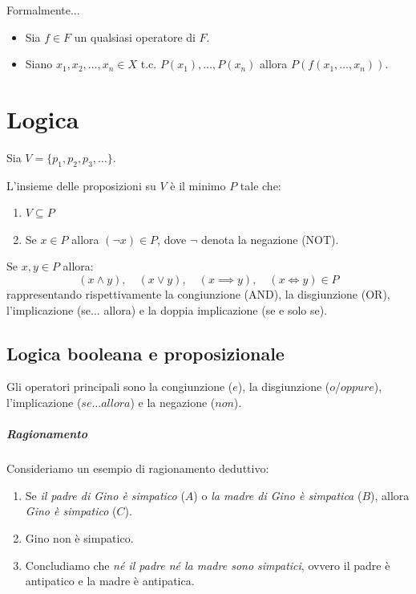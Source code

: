 \documentclass[12pt]{report}
\begin{document}
	Formalmente...
	\begin{itemize}
		\item Sia $f \in F$ un qualsiasi operatore di $F$.
		\item Siano $x_1, x_2, \dots, x_n \in X$ t.c. $P(x_1), \dots, P(x_n)$ allora $P(f(x_1, \dots, x_n))$.
	\end{itemize}
	
	\chapter{Logica}
	
	Sia $V = \{p_1, p_2, p_3, \dots\}$.
	
	L'insieme delle proposizioni su $V$ è il minimo $P$ tale che:
	\begin{enumerate}
		\item $V \subseteq P$
		\item Se $x \in P$ allora $(\neg x) \in P$, dove $\neg$ denota la negazione (NOT).
	\end{enumerate}
	
	Se $x, y \in P$ allora:
	\[
	(x \land y), \quad (x \lor y), \quad (x \implies y), \quad (x \iff y) \in P
	\]
	rappresentando rispettivamente la congiunzione (AND), la disgiunzione (OR), l'implicazione (se... allora) e la doppia implicazione (se e solo se).
	
	\section{Logica booleana e proposizionale}
	Gli operatori principali sono la congiunzione ($e$), la disgiunzione ($o$/$oppure$), l'implicazione ($se\dots allora$) e la negazione ($non$).
	
	\paragraph{Ragionamento}
	Consideriamo un esempio di ragionamento deduttivo:
	\begin{enumerate}
		\item Se \textit{il padre di Gino è simpatico} ($A$) o \textit{la madre di Gino è simpatica} ($B$), allora \textit{Gino è simpatico} ($C$).
		\item Gino non è simpatico.
		\item Concludiamo che \textit{né il padre né la madre sono simpatici}, ovvero il padre è antipatico e la madre è antipatica.
		
	\end{enumerate}
	
\end{document}
